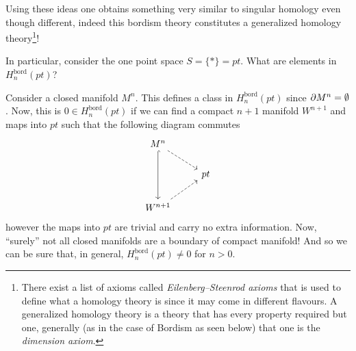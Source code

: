 Using these ideas one obtains something very similar to singular homology even though different, indeed this bordism theory constitutes a generalized homology theory\footnote{There exist a list of axioms called \textit{Eilenberg–Steenrod axioms} that is used to define what a homology theory is since it may come in different flavours. A generalized homology theory is a theory that has every property required but one, generally (as in the case of Bordism as seen below) that one is the \textit{dimension axiom}.}! 

\medskip

In particular, consider the one point space $S=\{*\}=pt$. What are elements in $H^{\text{bord}}_n(pt)$?

\noindent Consider a closed manifold $M^n$. This defines a class in $H^{\text{bord}}_n(pt)$ since $\partial M^n = \emptyset$. Now, this is $0 \in H^{\text{bord}}_n(pt)$ if we can find a compact $n+1$ manifold $W^{n+1}$ and maps into $pt$ such that the following diagram commutes
\begin{equation*}
    \begin{tikzcd}
        M^n \arrow[dd,  hook] \arrow[rd, dashed]                         \\
                                                & pt \\
        W^{n+1} \arrow[ru, dashed] 
    \end{tikzcd}
\end{equation*}
however the maps into $pt$ are trivial and carry no extra information. 
Now, ``surely'' not all closed manifolds are a boundary of compact manifold! And so we can be sure that, in general, $H^{\text{bord}}_n(pt)\neq0$ for $n>0$.

\medskip

